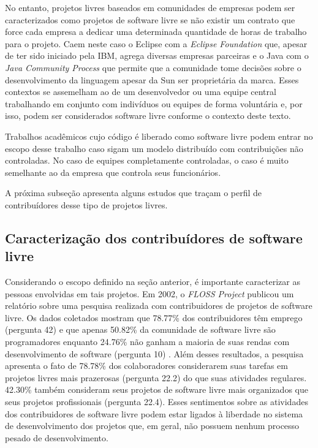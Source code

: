 No entanto, projetos livres baseados em comunidades de empresas podem
ser caracterizados como projetos de software livre se não existir um
contrato que force cada empresa a dedicar uma determinada quantidade
de horas de trabalho para o projeto. Caem neste caso o Eclipse com a
\emph{Eclipse Foundation} que, apesar de ter sido iniciado pela IBM,
agrega diversas empresas parceiras e o Java com o \emph{Java Community
  Process} que permite que a comunidade tome decisões sobre o
desenvolvimento da linguagem apesar da Sun ser proprietária da
marca. Esses contextos se assemelham ao de um desenvolvedor ou uma
equipe central trabalhando em conjunto com indivíduos ou equipes de
forma voluntária e, por isso, podem ser considerados software livre
conforme o contexto deste texto.

Trabalhos acadêmicos cujo código é liberado como software livre podem
entrar no escopo desse trabalho caso sigam um modelo distribuído com
contribuições não controladas. No caso de equipes completamente
controladas, o caso é muito semelhante ao da empresa que controla seus
funcionários.

A próxima subseção apresenta alguns estudos que traçam o perfil de
contribuídores desse tipo de projetos livres.

\subsection{Caracterização dos contribuídores de software livre}
\label{subsec:caracterizacao}

Considerando o escopo definido na seção anterior, é importante
caracterizar as pessoas envolvidas em tais projetos. Em 2002, o
\emph{FLOSS Project} \cite{FlossProject} publicou um relatório sobre
uma pesquisa realizada com contribuidores de projetos de software
livre. Os dados coletados mostram que 78.77\% dos contribuidores têm
emprego (pergunta 42) e que apenas 50.82\% da comunidade de software
livre são programadores enquanto 24.76\% não ganham a maioria de suas
rendas com desenvolvimento de software (pergunta 10)
\cite{FlossStats}. Além desses resultados, a pesquisa apresenta o fato
de 78.78\% dos colaboradores considerarem suas tarefas em projetos
livres mais prazerosas (pergunta 22.2) do que suas atividades
regulares. 42.30\% também consideram seus projetos de software livre
mais organizados que seus projetos profissionais (pergunta 22.4).
Esses sentimentos sobre as atividades dos contribuidores de software
livre podem estar ligados à liberdade no sistema de desenvolvimento
dos projetos que, em geral, não possuem nenhum processo pesado de
desenvolvimento.

